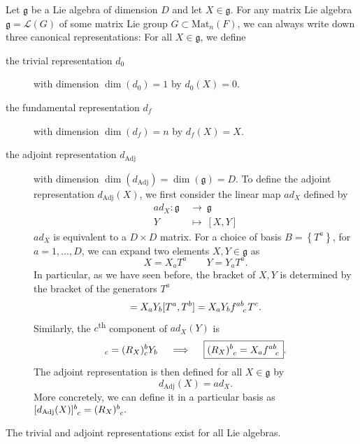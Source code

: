 Let $\mathfrak{g}$ be a Lie algebra of dimension $D$ and let $X \in \mathfrak{g}$.
For any matrix Lie algebra $\mathfrak{g} = \mathscr{L}(G)$ of some matrix Lie group $G \subset \text{Mat}_n(F)$, we can always write down three canonical representations: For all $X \in \mathfrak{g}$, we define
\begin{description}
  \item[the trivial representation $d_0$] with dimension $\dim(d_0) = 1$ by $d_0(X) = 0$.
  \item[the fundamental representation $d_f$] with dimension $\dim(d_f) = n$ by $d_f(X) = X$.
  \item[the adjoint representation $d_{\text{Adj}}$] with dimension $\dim(d_{\text{Adj}}) = \dim( \mathfrak{g}) = D$. To define the adjoint representation $d_{\text{Adj}}(X)$, we first consider the linear map $ad_X$ defined by
    \begin{equation}
      \begin{split}
        ad_X \colon \mathfrak{g} \ &\to\  \mathfrak{g} \\
	Y \ &\mapsto\  [X,Y]
      \end{split}
    \end{equation}
    $ad_X$ is equivalent to a $D \times D$ matrix. For a choice of basis $B = \left\{ T^a \right\}$, for $a = 1, \dots, D$, we can expand two elements $X, Y \in \mathfrak{g}$ as
    \begin{equation}
      X = X_a T^a \qquad Y = Y_a T^a.
    \end{equation}
    In particular, as we have seen before, the bracket of $X, Y$ is determined by the bracket of the generators $T^a$
    \begin{equation}
      [X, Y] = X_a Y_b [T^a, T^b] = X_a Y_b f \indices{^a^b_c}T^c.
    \end{equation}
    Similarly, the $c$\textsuperscript{th} component of $ad_X(Y)$ is
    \begin{equation}
      [ad_X(Y)]_c = (R_X)^b_c Y_b \quad \implies \quad \boxed{(R_X) \indices{^b_c} = X_a f \indices{^a^b_c}}.
    \end{equation}
    The adjoint representation is then defined for all $X \in \mathfrak{g}$ by
    \begin{equation}
      d_{\text{Adj}}(X) = ad_X.
    \end{equation}
    More concretely, we can define it in a particular basis as $[d_{\text{Adj}}(X)] \indices{^b_c} = (R_X) \indices{^b_c}.$ 
\end{description}
\begin{leftbar}
  \begin{remark}
    The trivial and adjoint representations exist for all Lie algebras.
  \end{remark}
\end{leftbar}
